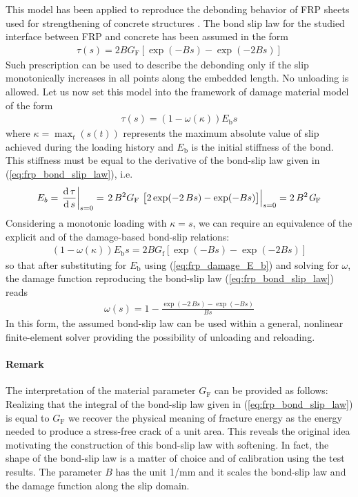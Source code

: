 \documentclass[main.tex]{subfiles}
\begin{document}
This model has been applied to reproduce the debonding behavior of FRP sheets used for strengthening of concrete structures \cite{dai_development_2005}.
The bond slip law for the studied interface between FRP and concrete has been assumed in the form
\begin{align}
\label{eq:frp_bond_slip_law}
\tau(s) = 2 B G_{\mathrm{F}} 
\left[\exp(-Bs)-\exp(-2Bs)\right]
\end{align}
Such prescription can be used to describe the debonding only if the slip monotonically increases in all points along the embedded length. No unloading is allowed. Let us now set this model into the framework of damage material model of the form
\begin{align}
    \label{eq:bond_damage_frp_general}
    \tau(s) = ( 1 - \omega(\kappa) ) E_{\mathrm{b}} s
\end{align}
where $\kappa = \max_t(s(t))$ represents the maximum absolute value of slip achieved during the loading history and $E_\mathrm{b}$ is the initial stiffness of the bond. This stiffness must be equal to the derivative of the bond-slip law
given in (\ref{eq:frp_bond_slip_law}), i.e.
\begin{align}
    \label{eq:frp_damage_E_b}
    E_b = \left.
    \frac{\mathrm{d}\,\tau}
    {\mathrm{d}\,s}\right|_{s=0} =
    \left.
    2\,B^2{ G_{\mathrm{F}}}\, \left[
    2\,{\exp(-2\,B s)}
    -{\exp(-B s)}
 \right]
 \right|_{s=0}
=
2\,{B}^{2}{\it G_{\mathrm{F}}}
\end{align}
Considering a monotonic loading with $\kappa = s$, we can require an equivalence of the explicit and of the damage-based bond-slip relations:
\begin{align}
( 1 - \omega(\kappa) ) E_{\mathrm{b}} s =
2 B G_{\mathrm{f}} [\exp(-Bs)-\exp(-2Bs)]
\end{align}
so that after substituting for $E_\mathrm{b}$ using (\ref{eq:frp_damage_E_b}) and solving for $\omega$, the damage function reproducing the bond-slip law (\ref{eq:frp_bond_slip_law}) reads
\begin{align} \label{eq:damage_fn}
\omega(s) = 
1 - {\frac {{\exp(-2\,Bs)}-{\exp(-Bs)}}{Bs}}
\end{align}
In this form, the assumed bond-slip law can be used within a general, nonlinear finite-element solver
providing the possibility of unloading and reloading.

\paragraph{Remark}
The interpretation of the material parameter 
$G_{\mathrm{F}}$ can be provided as follows:
Realizing that the integral of the bond-slip law 
given in (\ref{eq:frp_bond_slip_law}) is equal to $G_\mathrm{F}$ we recover the physical meaning of fracture energy as the energy needed to produce a stress-free crack of a unit area. This reveals the original idea motivating the construction of this  bond-slip law with softening. In fact, the shape of the bond-slip law is a matter of choice and of calibration using the test results. 
The parameter $B$ has the unit 1/mm and it scales the bond-slip law and the damage function along the slip domain.
\end{document}
